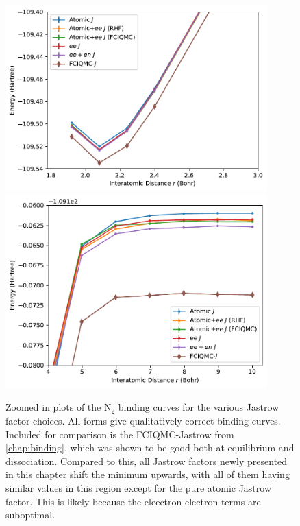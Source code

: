 \begin{figure}[htbp]
    \centering
    \includegraphics[width=0.9\textwidth]{figures/universal/n2_avtz_min}
    \includegraphics[width=0.9\textwidth]{figures/universal/n2_avtz_diss}
    \caption{Zoomed in plots of the N$_2$ binding curves for the various Jastrow factor choices. All forms give qualitatively correct binding curves. Included for comparison is the FCIQMC-Jastrow from \autoref{chap:binding}, which was shown to be good both at equilibrium and dissociation. Compared to this, all Jastrow factors newly presented in this chapter shift the minimum upwards, with all of them having similar values in this region except for the pure atomic Jastrow factor. This is likely because the eleectron-electron terms are suboptimal. 
    }
    \label{eq:binding-universal-zoom}
\end{figure}

